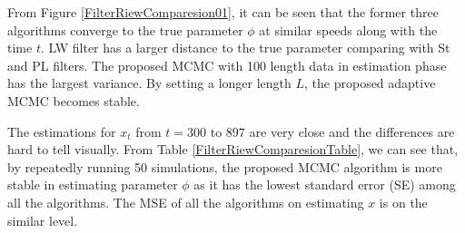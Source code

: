 

From Figure \ref{FilterRiewComparesion01}, it can be seen that the former three algorithms converge to the true parameter $\phi$ at similar speeds along with the time $t$. LW filter has a larger distance to the true parameter comparing with St and PL filters. The proposed MCMC with 100 length data in estimation phase has the largest variance. By setting a longer length $L$, the proposed adaptive MCMC becomes stable. 

The estimations for $x_t$ from $t=300$ to $897$ are very close and the differences are hard to tell visually. From Table \ref{FilterRiewComparesionTable}, we can see that, by repeatedly running 50 simulations, the proposed MCMC algorithm is more stable in estimating parameter $\phi$ as it has the lowest standard error (SE) among all the algorithms. The MSE of all the algorithms on estimating $x$ is on the similar level.  


